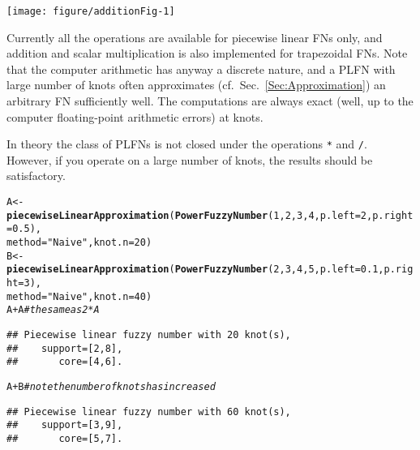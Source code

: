 \documentclass[11pt]{article}\usepackage[]{graphicx}\usepackage[]{color}
\makeatletter
\newcommand{\hlnum}[1]{\textcolor[rgb]{0.686,0.059,0.569}{#1}}%
\newcommand{\hlstr}[1]{\textcolor[rgb]{0.192,0.494,0.8}{#1}}%
\newcommand{\hlcom}[1]{\textcolor[rgb]{0.678,0.584,0.686}{\textit{#1}}}%
\newcommand{\hlopt}[1]{\textcolor[rgb]{0,0,0}{#1}}%
\newcommand{\hlstd}[1]{\textcolor[rgb]{0.345,0.345,0.345}{#1}}%
\newcommand{\hlkwb}[1]{\textcolor[rgb]{0.69,0.353,0.396}{#1}}%
\newcommand{\hlkwc}[1]{\textcolor[rgb]{0.333,0.667,0.333}{#1}}%
\newcommand{\hlkwd}[1]{\textcolor[rgb]{0.737,0.353,0.396}{\textbf{#1}}}%
\newenvironment{kframe}{%
 \def\at@end@of@kframe{}%
 \ifinner\ifhmode%
  \def\at@end@of@kframe{\end{minipage}}%
  \begin{minipage}{\columnwidth}%
 \fi\fi%
 \def\FrameCommand##1{\hskip\@totalleftmargin \hskip-\fboxsep
 \colorbox{shadecolor}{##1}\hskip-\fboxsep
     \hskip-\linewidth \hskip-\@totalleftmargin \hskip\columnwidth}%
 \MakeFramed {\advance\hsize-\width
   \@totalleftmargin\z@ \linewidth\hsize
   \@setminipage}}%
 {\par\unskip\endMakeFramed%
 \at@end@of@kframe}
\newenvironment{knitrout}{}{} %
\makeatother
\begin{document}
\begin{center}
\begin{knitrout}\small
{}\color{fgcolor}

{\centering \texttt{[image: figure/additionFig-1]} 

}



\end{knitrout}
\end{center}


Currently all the operations are available
for piecewise linear FNs only,
and addition and scalar multiplication
is also implemented for trapezoidal FNs.
Note that the computer arithmetic has anyway
a discrete nature, and a PLFN with large number
of knots often approximates (cf.~Sec.~\ref{Sec:Approximation})
an arbitrary FN sufficiently well.
The computations are always exact (well, up to the computer
floating-point arithmetic errors) at knots.

In theory the class of PLFNs is not closed
under the operations \texttt{*} and \texttt{/}.
However, if you operate on a large number of knots,
the results should be satisfactory.



\begin{knitrout}\small
{}\color{fgcolor}\begin{kframe}
\begin{alltt}
\hlstd{A} \hlkwb{<-} \hlkwd{piecewiseLinearApproximation}\hlstd{(}\hlkwd{PowerFuzzyNumber}\hlstd{(}\hlnum{1}\hlstd{,}\hlnum{2}\hlstd{,}\hlnum{3}\hlstd{,}\hlnum{4}\hlstd{,}\hlkwc{p.left}\hlstd{=}\hlnum{2}\hlstd{,}\hlkwc{p.right}\hlstd{=}\hlnum{0.5}\hlstd{),}
   \hlkwc{method}\hlstd{=}\hlstr{"Naive"}\hlstd{,} \hlkwc{knot.n}\hlstd{=}\hlnum{20}\hlstd{)}
\hlstd{B} \hlkwb{<-} \hlkwd{piecewiseLinearApproximation}\hlstd{(}\hlkwd{PowerFuzzyNumber}\hlstd{(}\hlnum{2}\hlstd{,}\hlnum{3}\hlstd{,}\hlnum{4}\hlstd{,}\hlnum{5}\hlstd{,}\hlkwc{p.left}\hlstd{=}\hlnum{0.1}\hlstd{,}\hlkwc{p.right}\hlstd{=}\hlnum{3}\hlstd{),}
   \hlkwc{method}\hlstd{=}\hlstr{"Naive"}\hlstd{,} \hlkwc{knot.n}\hlstd{=}\hlnum{40}\hlstd{)}
\hlstd{A}\hlopt{+}\hlstd{A} \hlcom{# the same as 2*A}
\end{alltt}
\begin{verbatim}
## Piecewise linear fuzzy number with 20 knot(s),
##    support=[2,8],
##       core=[4,6].
\end{verbatim}
\begin{alltt}
\hlstd{A}\hlopt{+}\hlstd{B} \hlcom{# note the number of knots has increased}
\end{alltt}
\begin{verbatim}
## Piecewise linear fuzzy number with 60 knot(s),
##    support=[3,9],
##       core=[5,7].
\end{verbatim}
\end{kframe}
\end{knitrout}
\end{document}
